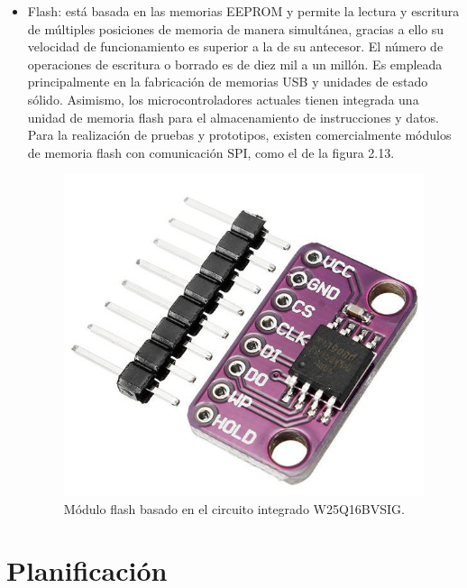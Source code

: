 \begin{itemize}
	\item Flash: está basada en las memorias EEPROM y permite la lectura y escritura de múltiples posiciones de memoria de manera simultánea, gracias a ello su velocidad de funcionamiento es superior a la de su antecesor. El número de operaciones de escritura o borrado es de diez mil a un millón. Es empleada principalmente en la fabricación de memorias USB y unidades de estado sólido. Asimismo, los microcontroladores actuales tienen integrada una unidad de memoria flash para el almacenamiento de instrucciones y datos. Para la realización de pruebas y prototipos, existen comercialmente módulos de memoria flash con comunicación SPI, como el de la figura 2.13.
	\begin{figure}[h]
		\centering
		\includegraphics[scale=0.3]{./Figures/flash.jpg}
		\caption{Módulo flash basado en el circuito integrado W25Q16BVSIG\protect\footnotemark.}
		\label{fig:cuadradoAzul}
	\end{figure}

	
\end{itemize}


\section{Planificación}

